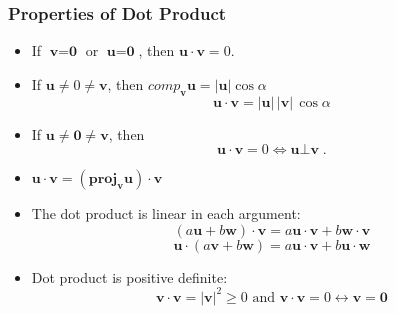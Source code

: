 \begin{frame}
 \frametitle{Properties of Dot Product}

  \begin{itemize}
   \item If $\textbf{v}=\textbf{0}$ or $\textbf{u}=\textbf{0}$, then $\textbf{u}\cdot \textbf{v} =0$.

  \item If $\textbf{u} \neq 0 \neq \textbf{v}$, then $comp_{\bm{v}} \textbf{u} = |\textbf{u}|\cos{\alpha}$
%
$$\textbf{u} \cdot \textbf{v} = |\textbf{u}| \, |\textbf{v}|\,\cos{\alpha}$$
%
\item If $\textbf{u}\neq \textbf{0} \neq \textbf{v}$, then
%
$$\textbf{u} \cdot \textbf{v} = 0 \Longleftrightarrow \textbf{u} \bot \textbf{v}\; .$$
%
\item $\textbf{u} \cdot \textbf{v} = (\textbf{proj}_{\bm{v}} \textbf{u}) \cdot \textbf{v}$

\item The dot product is linear in each argument:
%
$$ (a \textbf{u} + b \textbf{w}) \cdot \textbf{v} = a \textbf{u} \cdot \textbf{v} + b \textbf{w} \cdot \textbf{v}$$
%
$$ \textbf{u} \cdot (a \textbf{v} + b \textbf{w}) = a \textbf{u} \cdot \textbf{v} + b \textbf{u} \cdot \textbf{w}$$

\item Dot product is positive definite:
%
$$\textbf{v} \cdot \textbf{v} = |\textbf{v}|^2 \geqslant 0 \text{ and }
\textbf{v}\cdot \textbf{v} = 0 \leftrightarrow \textbf{v}=\textbf{0}$$
  \end{itemize}

\end{frame}